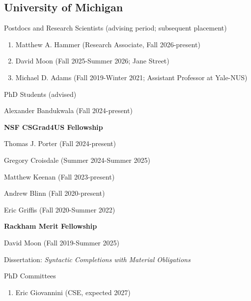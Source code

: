 \documentclass[10pt,letterpaper]{article}
\renewenvironment{itemize}{
  \begin{list}{}{
    \setlength{\leftmargin}{1.25em}
    \setlength{\itemsep}{0.25em}
    \setlength{\parskip}{0pt}
    \setlength{\parsep}{0.2em}
  }
}{
  \end{list}
}
\begin{document}
\subsection*{University of Michigan}
\begin{itemize}
  \item Postdocs and Research Scientists (advising period; subsequent placement)
        \begin{enumerate}
          \item Matthew A. Hammer (Research Associate, Fall 2026-present)
          \item David Moon (Fall 2025-Summer 2026; Jane Street)
          \item Michael D. Adams (Fall 2019-Winter 2021; Assistant Professor at Yale-NUS)
        \end{enumerate}
  \item PhD Students (advised)
        \begin{enumerate}
          \item Alexander Bandukwala (Fall 2024-present)
            \begin{itemize}
              \item \textbf{NSF CSGrad4US Fellowship}
            \end{itemize}
          \item Thomas J. Porter (Fall 2024-present)
          \item Gregory Croisdale (Summer 2024-Summer 2025)
          \item Matthew Keenan (Fall 2023-present)
          \item Andrew Blinn (Fall 2020-present)
          \item Eric Griffis (Fall 2020-Summer 2022)
            \begin{itemize}
              \item \textbf{Rackham Merit Fellowship}
            \end{itemize}
          \item David Moon (Fall 2019-Summer 2025)
            \begin{itemize}
              \item Dissertation: \textit{Syntactic Completions with Material Obligations}
            \end{itemize}
        \end{enumerate}
  \item PhD Committees
        \begin{enumerate}
          \item Eric Giovannini (CSE, expected 2027)

\end{enumerate}
\end{itemize}
\end{document}
